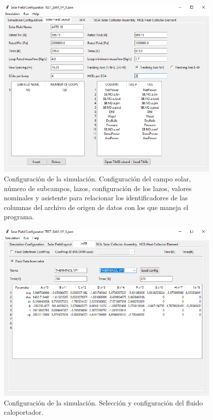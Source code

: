 \begin{figure}
\includegraphics[scale=0.8]{images/interface02.png}
\caption{Configuración de la simulación. Configuración del campo solar, número de subcampos, lazos, configuración de los lazos, valores nominales y asistente para relacionar los identificadores de las columnas del archivo de origen de datos con los que maneja el programa.} 
\label{fig:interface02}
\end{figure}

\begin{figure}
\includegraphics[scale=0.8]{images/interface03.png}
\caption{Configuración de la simulación. Selección y configuración del fluido caloportador.} 
\label{fig:interface03}
\end{figure}

